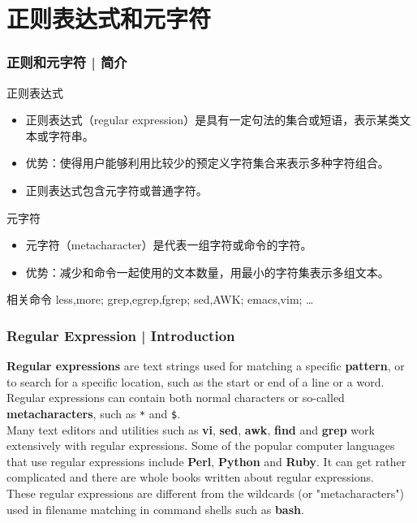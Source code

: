 \section{正则表达式和元字符}
\begin{frame}
  \frametitle{正则和元字符 | 简介}
  \begin{block}{正则表达式}
    \begin{itemize}
      \item 正则表达式（regular expression）是具有一定句法的集合或短语，表示某类文本或字符串。
      \item 优势：使得用户能够利用比较少的预定义字符集合来表示多种字符组合。
      \item 正则表达式包含元字符或普通字符。
    \end{itemize}
  \end{block}
  \pause
  \begin{block}{元字符}
    \begin{itemize}
      \item 元字符（metacharacter）是代表一组字符或命令的字符。
      \item 优势：减少和命令一起使用的文本数量，用最小的字符集表示多组文本。
    \end{itemize}
  \end{block}
  \pause
  \begin{block}{相关命令}
    less,more; grep,egrep,fgrep; sed,AWK; emacs,vim; \ldots
  \end{block}
\end{frame}

\begin{frame}[fragile]
  \frametitle{Regular Expression | Introduction}
  \textbf{Regular expressions} are text strings used for matching a specific \textbf{pattern}, or to search for a specific location, such as the start or end of a line or a word. Regular expressions can contain both normal characters or so-called \textbf{metacharacters}, such as \verb|*| and \verb|$|.\\
  \vspace{0.3cm}
  Many text editors and utilities such as \textbf{vi}, \textbf{sed}, \textbf{awk}, \textbf{find} and \textbf{grep} work extensively with regular expressions. Some of the popular computer languages that use regular expressions include \textbf{Perl}, \textbf{Python} and \textbf{Ruby}. It can get rather complicated and there are whole books written about regular expressions.\\
  \vspace{0.3cm}
  These regular expressions are different from the wildcards (or "metacharacters") used in filename matching in command shells such as \textbf{bash}.
\end{frame}

